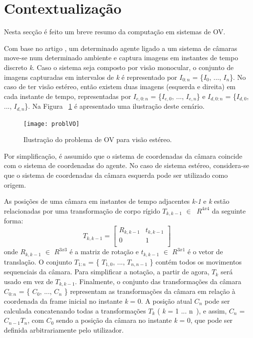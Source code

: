 \section{Contextualização}

Nesta secção é feito um breve resumo da computação em sistemas de OV.

Com base no artigo \cite{VOpart1}, um determinado agente ligado a um sistema de câmaras move-se num determinado ambiente e captura imagens em instantes de tempo discreto \textit{k}. Caso o sistema seja composto por visão monocular, o conjunto de imagens capturadas em intervalos de \textit{k} é representado por  \textit{$I_{0:n}$}  = \{\textit{$I_0$}, ..., \textit{$I_n$}\}. 
No caso de ter visão estéreo, então existem duas imagens (esquerda e direita) em cada instante de tempo, representadas por \textit{$I_{e,0:n}$} = \{\textit{$I_{e,0}$}, ..., \textit{$I_{e,n}$}\} e \textit{$I_{d,0:n}$} = \{\textit{$I_{d,0}$}, ..., \textit{$I_{d,n}$}\}. 
Na Figura ~\ref{fig:arch} é apresentado uma ilustração deste cenário. 


\begin{figure}[h!] %
	\begin{center}
		\leavevmode		
		\texttt{[image: problVO]}
		\caption{Ilustração do problema de OV para visão estéreo.  \cite{VOpart1}}
		\label{fig:arch}
	\end{center}
\end{figure}

Por simplificação, é assumido que o sistema de coordenadas da câmara coincide com o sistema de coordenadas do agente. No caso de sistema estéreo, considera-se que o sistema de coordenadas da câmara esquerda pode ser utilizado como origem.

As posições de uma câmara em instantes de tempo adjacentes \textit{k-1} e \textit{k} estão relacionadas por uma transformação de corpo rígido $T_{k,k-1}$ $\in\ $ $R^{4x4}$ da seguinte forma: \[ T_{k,k-1} = \left[\begin{array}{cc} R_{k,k-1} & t_{k,k-1} \\  0 & 1 \\ \end{array} \right] \]
onde $R_{k,k-1}$ $\in$ $R^{3x3}$ é a matriz de rotação e $t_{k,k-1}$ $\in$ $R^{3x1}$ é o vetor de translação. O conjunto $T_{1:n}$ = \{ $T_{1,0}$, ..., $T_{n,n-1}$ \} contém todos os movimentos sequenciais da câmara. Para simplificar
a notação, a partir de agora, $T_k$ será usado em vez de $T_{k,k-1}$. Finalmente, o conjunto das transformações da câmara $C_{0:n}$ = \{ $C_0$, ..., $C_n$ \} representam as transformações da câmara em relação à coordenada da frame inicial no instante \textit{k} = 0. A posição atual $C_n$ pode ser calculada concatenando todas a transformações $T_k$ ( \textit{k} = 1 ... n\ ), e assim, $C_n$ = $C_{n-1}T_n$, com $C_0$ sendo a posição da câmara no instante \textit{k} = 0, que pode ser definida arbitrariamente pelo utilizador.

